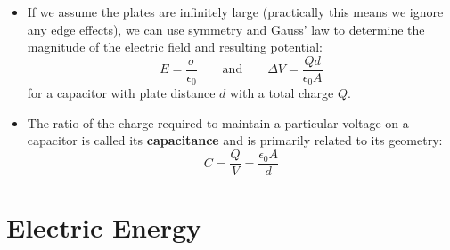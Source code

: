 \documentclass{article}
\begin{document}
\begin{itemize}
\item If we assume the plates are infinitely large (practically this means we ignore any edge effects), we can use symmetry and Gauss' law to determine the magnitude of the electric field and resulting potential:
%
\begin{equation*}
E = \frac{\sigma}{\epsilon_0}
\qquad \text{and} \qquad
\Delta V = \frac{Q d}{\epsilon_0 A}
\end{equation*}
for a capacitor with plate distance $d$ with a total charge $Q$.

\item The ratio of the charge required to maintain a particular voltage on a capacitor is called its \textbf{capacitance} and is primarily related to its geometry:
%
\begin{equation*}
C = \frac{Q}{V} = \frac{\epsilon_0 A}{d}
\end{equation*}
\end{itemize}

\newpage
\section{Electric Energy}

\end{document}
